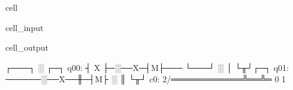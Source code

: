 \documentclass[letterpaper,10pt,english]{jupyterBook}
\begin{document}
\begin{sphinxuseclass}{cell}\begin{sphinxVerbatimInput}

\begin{sphinxuseclass}{cell_input}
\begin{sphinxVerbatim}[commandchars=\\\{\}]
   
  
\PYG{p}{[}\PYG{p}{]}\PYG{p}{[}\PYG{p}{]}
\end{sphinxVerbatim}

\end{sphinxuseclass}\end{sphinxVerbatimInput}
\begin{sphinxVerbatimOutput}

\begin{sphinxuseclass}{cell_output}
\begin{sphinxVerbatim}[commandchars=\\\{\}]
      ┌───┐ ░    ┌─┐
q0\PYGZus{}0: ┤ X ├─░──X─┤M├───
      └───┘ ░  │ └╥┘┌─┐
q0\PYGZus{}1: ──────░──X──╫─┤M├
            ░     ║ └╥┘
c0: 2/════════════╩══╩═
                  0  1
\end{sphinxVerbatim}

\end{sphinxuseclass}\end{sphinxVerbatimOutput}

\end{sphinxuseclass}
\end{document}
